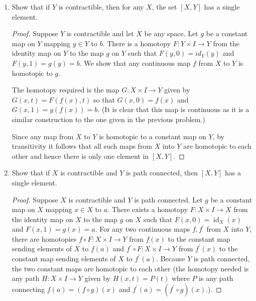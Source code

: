 \documentclass[11pt]{article}
\DeclareMathOperator{\id}{id}
\begin{document}
\begin{enumerate}
\begin{enumerate}[label=(\alph*)]
\begin{proof}
            Suppose that $X$ is a contractible space. Let $a,b$ be any two points in $X$. Then for a constant map $f$ on $X$ sending any $x$ to $b$, the identity map is homotopic to this map by some homotopy $F$. Then for any $x$, we can define a path $P_x\colon I\to X$ by $P_x(t) = F(x,t)$, which connects $x$ ($t=0$) to $b$ ($t=1$). So there are paths connecting any $x$ to $b$, and in particular, $P_a$ is a path connecting $a$ to $b$. Since $a,b$ were arbitrary it follows that $X$ is path connected.
        \end{proof}
        \item Show that if $Y$ is contractible, then for any $X$, the set $[X,Y]$ has a single element.
        \begin{proof}
            Suppose $Y$ is contractible and let $X$ be any space. Let $g$ be a constant map on $Y$ mapping $y\in Y$ to $b$. There is a homotopy $F\colon Y\times I\to Y$ from the identity map on $Y$ to the map $g$ on $Y$ such that $F(y,0) = id_Y(y)$ and $F(y,1) = g(y) = b$. We show that any continuous map $f$ from $X$ to $Y$ is homotopic to $g$.

            The homotopy required is the map $G\colon X\times I \to Y$ given by $G(x,t) = F(f(x),t)$ so that $G(x,0) = f(x)$ and $G(x,1) = g(f(x)) = b$. (It is clear that this map is continuous as it is a similar construction to the one given in the previous problem.)

            Since any map from $X$ to $Y$ is homotopic to a constant map on $Y$, by transitivity it follows that all such maps from $X$ into $Y$ are homotopic to each other and hence there is only one element in $[X,Y]$.
        \end{proof}
        \item Show that if $X$ is contractible and $Y$ is path connected, then $[X,Y]$ has a single element.
        \begin{proof}
            Suppose $X$ is contractible and $Y$ is path connected. Let $g$ be a constant map on $X$ mapping $x\in X$ to $a$. There exists a homotopy $F\colon X\times I \to X$ from the identity map on $X$ to the map $g$ on $X$ such that $F(x,0) = \id_X(x)$ and $F(x,1) = g(x) = a$. For any two continuous maps $f,f^{\prime}$ from $X$ into $Y$, there are homotopies $f\circ F \colon X\times I \to Y$ from $f(x)$ to the constant map sending elements of $X$ to $f(a)$ and $f^{\prime}\circ F \colon X\times I \to Y$ from $f^{\prime}(x)$ to the constant map sending elements of $X$ to $f^{\prime}(a)$. Because $Y$ is path connected, the two constant maps are homotopic to each other (the homotopy needed is any path $H\colon X\times I\to Y$ given by $H(x,t) = P(t)$ where $P$ is any path connecting $f(a) = (f\circ g)(x)$ and $f^{\prime}(a) = (f^{\prime}\circ g)(x)$.).


\end{proof}
\end{enumerate}
\end{enumerate}
\end{document}
